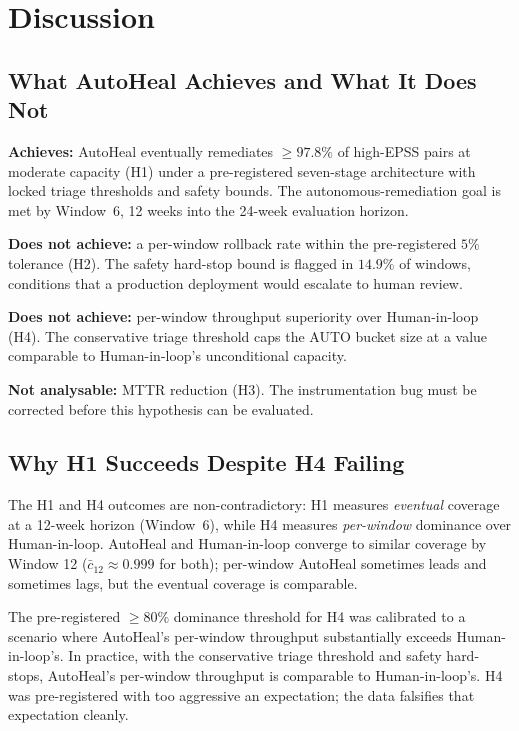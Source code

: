 \section{Discussion}

\subsection{What AutoHeal Achieves and What It Does Not}

\textbf{Achieves:} AutoHeal eventually remediates $\geq 97.8\%$ of
high-EPSS pairs at moderate capacity (H1) under a pre-registered
seven-stage architecture with locked triage thresholds and safety
bounds. The autonomous-remediation goal is met by Window~6, 
12 weeks into the 24-week evaluation horizon.

\textbf{Does not achieve:} a per-window rollback rate within the
pre-registered $5\%$ tolerance (H2). The safety hard-stop bound is
flagged in $14.9\%$ of windows, conditions that a production
deployment would escalate to human review.

\textbf{Does not achieve:} per-window throughput superiority over
Human-in-loop (H4). The conservative triage threshold caps the
AUTO bucket size at a value comparable to Human-in-loop's
unconditional capacity.

\textbf{Not analysable:} MTTR reduction (H3). The instrumentation
bug must be corrected before this hypothesis can be evaluated.

\subsection{Why H1 Succeeds Despite H4 Failing}

The H1 and H4 outcomes are non-contradictory: H1 measures
\emph{eventual} coverage at a 12-week horizon (Window~6), while H4 measures
\emph{per-window} dominance over Human-in-loop. AutoHeal and
Human-in-loop converge to similar coverage by Window 12
($\bar{c}_{12} \approx 0.999$ for both); per-window AutoHeal
sometimes leads and sometimes lags, but the eventual coverage
is comparable.

The pre-registered $\geq 80\%$ dominance threshold for H4 was
calibrated to a scenario where AutoHeal's per-window throughput
substantially exceeds Human-in-loop's. In practice, with the
conservative triage threshold and safety hard-stops, AutoHeal's
per-window throughput is comparable to Human-in-loop's. H4 was
pre-registered with too aggressive an expectation; the data
falsifies that expectation cleanly.

